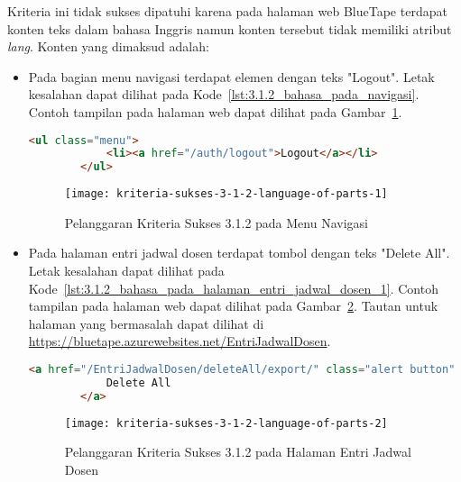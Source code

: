 Kriteria ini tidak sukses dipatuhi karena pada halaman web BlueTape terdapat konten teks dalam bahasa Inggris namun konten tersebut tidak memiliki atribut \textit{lang}. Konten yang dimaksud adalah:

\begin{itemize}
    \item Pada bagian menu navigasi terdapat elemen dengan teks "Logout". Letak kesalahan dapat dilihat pada \mbox{Kode \ref{lst:3.1.2_bahasa_pada_navigasi}}. Contoh tampilan pada halaman web dapat dilihat pada \mbox{Gambar \ref{fig:3.1.2_language_of_parts_1}}. 
    \begin{lstlisting}[frame=single, label={lst:3.1.2_bahasa_pada_navigasi}, language=HTML, caption=Pelanggaran Kriteria Sukses 3.1.2 pada Menu Navigasi]
        <ul class="menu">
            <li><a href="/auth/logout">Logout</a></li>
        </ul>
    \end{lstlisting}
    
    \begin{figure}[H]
        \centering  
        \texttt{[image: kriteria-sukses-3-1-2-language-of-parts-1]}  
        \caption[Pelanggaran Kriteria Sukses 3.1.2 pada Menu Navigasi]{Pelanggaran Kriteria Sukses 3.1.2 pada Menu Navigasi}
        \label{fig:3.1.2_language_of_parts_1}  
    \end{figure}

    \item Pada halaman entri jadwal dosen terdapat tombol dengan teks "Delete All". Letak kesalahan dapat dilihat pada \mbox{Kode \ref{lst:3.1.2_bahasa_pada_halaman_entri_jadwal_dosen_1}}. Contoh tampilan pada halaman web dapat dilihat pada \mbox{Gambar \ref{fig:3.1.2_language_of_parts_2}}. Tautan untuk halaman yang bermasalah dapat dilihat di \url{https://bluetape.azurewebsites.net/EntriJadwalDosen}.
    \begin{lstlisting}[frame=single, label={lst:3.1.2_bahasa_pada_halaman_entri_jadwal_dosen_1}, language=HTML, caption=Pelanggaran Kriteria Sukses 3.1.2 pada Halaman Entri Jadwal Dosen]
        <a href="/EntriJadwalDosen/deleteAll/export/" class="alert button" onClick="return konfirmasi();">
            Delete All
        </a>
    \end{lstlisting}
    
    \begin{figure}[H]
        \centering  
        \texttt{[image: kriteria-sukses-3-1-2-language-of-parts-2]}  
        \caption[Pelanggaran Kriteria Sukses 3.1.2 pada Halaman Entri Jadwal Dosen]{Pelanggaran Kriteria Sukses 3.1.2 pada Halaman Entri Jadwal Dosen}
        \label{fig:3.1.2_language_of_parts_2}  
    \end{figure}
    

\end{itemize}

